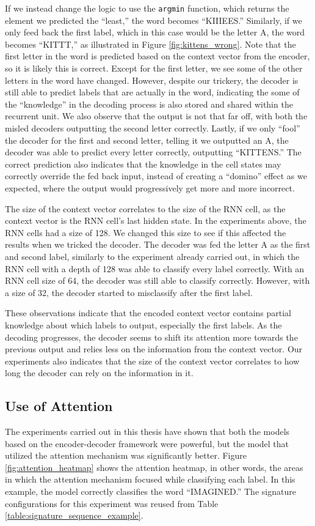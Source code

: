If we instead change the logic to use the {\tt argmin} function, which returns the element we predicted the ``least,'' the word becomes ``KIIIEES.'' Similarly, if we only feed back the first label, which in this case would be the letter A, the word becomes ``KITTT,'' as illustrated in Figure \ref{fig:kittens_wrong}. Note that the first letter in the word is predicted based on the context vector from the encoder, so it is likely this is correct. Except for the first letter, we see some of the other letters in the word have changed. However, despite our trickery, the decoder is still able to predict labels that are actually in the word, indicating the some of the ``knowledge'' in the decoding process is also stored and shared within the recurrent unit. We also observe that the output is not that far off, with both the misled decoders outputting the second letter correctly. Lastly, if we only ``fool'' the decoder for the first and second letter, telling it we outputted an A, the decoder was able to predict every letter correctly, outputting ``KITTENS.'' The correct prediction also indicates that the knowledge in the cell states may correctly override the fed back input, instead of creating a ``domino'' effect as we expected, where the output would progressively get more and more incorrect.

The size of the context vector correlates to the size of the RNN cell, as the context vector is the RNN cell's last hidden state. In the experiments above, the RNN cells had a size of 128. We changed this size to see if this affected the results when we tricked the decoder. The decoder was fed the letter A as the first and second label, similarly to the experiment already carried out, in which the RNN cell with a depth of 128 was able to classify every label correctly. With an RNN cell size of 64, the decoder was still able to classify correctly. However, with a size of 32, the decoder started to misclassify after the first label.

These observations indicate that the encoded context vector contains partial knowledge about which labels to output, especially the first labels. As the decoding progresses, the decoder seems to shift its attention more towards the previous output and relies less on the information from the context vector. Our experiments also indicates that the size of the context vector correlates to how long the decoder can rely on the information in it.

\subsection{Use of Attention}
The experiments carried out in this thesis have shown that both the models based on the encoder-decoder framework were powerful, but the model that utilized the attention mechanism was significantly better. Figure \ref{fig:attention_heatmap} shows the attention heatmap, in other words, the areas in which the attention mechanism focused while classifying each label. In this example, the model correctly classifies the word ``IMAGINED.'' The signature configurations for this experiment was reused from Table \ref{table:signature_sequence_example}.

